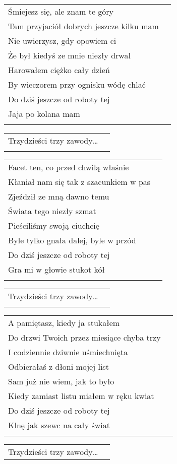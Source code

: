 \documentclass[a5paper]{article}
\begin{document}
\noindent
\begin{tabular}{@{}p{7.50cm}p{3cm}@{}}
Śmiejesz się, ale znam te góry\\
Tam przyjaciół dobrych jeszcze kilku mam\\
Nie uwierzysz, gdy opowiem ci\\
Że był kiedyś ze mnie niezły drwal\\
Harowałem ciężko cały dzień\\
By wieczorem przy ognisku wódę chlać\\
Do dziś jeszcze od roboty tej\\
Jaja po kolana mam\\\\
\end{tabular}

\noindent
\begin{tabular}{@{}p{7.50cm}p{3cm}@{}}
Trzydzieści trzy zawody… \\ \\
\end{tabular}

\noindent
\begin{tabular}{@{}p{7.50cm}p{3cm}@{}} 
Facet ten, co przed chwilą właśnie\\
Kłaniał nam się tak z szacunkiem w pas\\
Zjeździł ze mną dawno temu\\
Świata tego niezły szmat\\
Pieściliśmy swoją ciuchcię\\
Byle tylko gnała dalej, byle w przód\\
Do dziś jeszcze od roboty tej\\
Gra mi w głowie stukot kół\\\\
\end{tabular}

\noindent
\begin{tabular}{@{}p{7.50cm}p{3cm}@{}}
Trzydzieści trzy zawody… \\ \\
\end{tabular}

\noindent
\begin{tabular}{@{}p{7.50cm}p{3cm}@{}}
A pamiętasz, kiedy ja stukałem\\
Do drzwi Twoich przez miesiące chyba trzy\\
I codziennie dziwnie uśmiechnięta\\
Odbierałaś z dłoni mojej list\\
Sam już nie wiem, jak to było\\
Kiedy zamiast listu miałem w ręku kwiat\\
Do dziś jeszcze od roboty tej\\
Klnę jak szewc na cały świat\\\\
\end{tabular}

\noindent
\begin{tabular}{@{}p{7.50cm}p{3cm}@{}}
   Trzydzieści trzy zawody…
\end{tabular}
\end{document}
